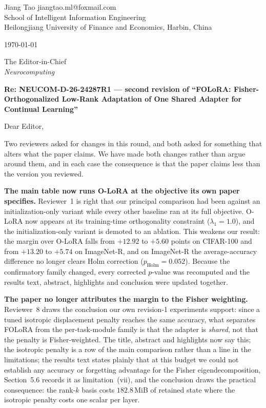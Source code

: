 \documentclass[11pt,a4paper]{article}
\begin{document}
\begin{flushright}
\small
Jiang Tao \quad jiangtao.ml@foxmail.com\\
School of Intelligent Information Engineering\\
Heilongjiang University of Finance and Economics, Harbin, China
\end{flushright}

\vspace{-6pt}
\noindent\small \today

\vspace{7pt}
\noindent The Editor-in-Chief\\
\noindent\emph{Neurocomputing}

\vspace{7pt}
\noindent\textbf{Re: NEUCOM-D-26-24287R1 --- second revision of ``FOLoRA: Fisher-Orthogonalized
Low-Rank Adaptation of One Shared Adapter for Continual Learning''}

\vspace{6pt}
Dear Editor,

Two reviewers asked for changes in this round, and both asked for something that alters what
the paper claims. We have made both changes rather than argue around them, and in each case
the consequence is that the paper claims less than the version you reviewed.

\medskip
\noindent\textbf{The main table now runs O-LoRA at the objective its own paper specifies.}
Reviewer~1 is right that our principal comparison had been against an initialization-only
variant while every other baseline ran at its full objective. O-LoRA now appears at its
training-time orthogonality constraint ($\lambda_1{=}1.0$), and the initialization-only
variant is demoted to an ablation. This weakens our result: the margin over O-LoRA falls from
$+12.92$ to $+5.60$ points on CIFAR-100 and from $+13.20$ to $+5.74$ on ImageNet-R, and on
ImageNet-R the average-accuracy difference no longer clears Holm correction
($p_{\mathrm{Holm}}{=}0.052$). Because the confirmatory family changed, every corrected
$p$-value was recomputed and the results text, abstract, highlights and conclusion were
updated together.

\medskip
\noindent\textbf{The paper no longer attributes the margin to the Fisher weighting.} Reviewer~8
draws the conclusion our own revision-1 experiments support: since a tuned isotropic
displacement penalty reaches the same accuracy, what separates FOLoRA from the
per-task-module family is that the adapter is \emph{shared}, not that the penalty is
Fisher-weighted. The title, abstract and highlights now say this; the isotropic penalty is a
row of the main comparison rather than a line in the limitations; the results text states
plainly that at this budget we could not establish any accuracy or forgetting advantage for
the Fisher eigendecomposition, Section~5.6 records it as limitation~(vii), and the conclusion
draws the practical consequence: the rank-$k$ basis costs $182.8$\,MiB of retained state where
the isotropic penalty costs one scalar per layer.
\end{document}
